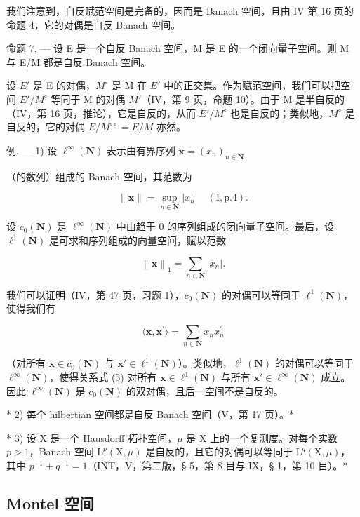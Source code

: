 我们注意到，自反赋范空间是完备的，因而是 Banach 空间，且由 IV 第 16 页的命题 4，它的对偶是自反 Banach 空间。

命题 7. --- 设 E 是一个自反 Banach 空间，M 是 E 的一个闭向量子空间。则 M 与 E/M 都是自反 Banach 空间。

设 \(E'\) 是 E 的对偶，\(M^{\circ}\) 是 M 在 \(E'\) 中的正交集。作为赋范空间，我们可以把空间 \(E'/M^{\circ}\) 等同于 M 的对偶 \(M'\)（IV，第 9 页，命题 10）。由于 M 是半自反的（IV，第 16 页，推论），它是自反的，从而 \(E'/M^{\circ}\) 也是自反的；类似地，\(M^{\circ}\) 是自反的，它的对偶 \(E/M^{\circ\circ} = E/M\) 亦然。

例. --- 1) 设 \(\ell^{\infty}(\mathbf{N})\) 表示由有界序列 \(\mathbf{x} = (x_n)_{n\in \mathbf{N}}\)

（的数列）组成的 Banach 空间，其范数为

\[
\| \mathbf {x} \| = \sup _ {n \in \mathbf {N}} | x _ {n} | \quad (\mathrm{I}, \text {p.} 4).\tag{3}
\]

设 \(c_{0}(\mathbf{N})\) 是 \(\ell^{\infty}(\mathbf{N})\) 中由趋于 0 的序列组成的闭向量子空间。最后，设 \(\ell^{1}(\mathbf{N})\) 是可求和序列组成的向量空间，赋以范数

\[
\left\| \mathbf {x} \right\| _ {1} = \sum_ {n \in \mathbf {N}} \left| x _ {n} \right|.\tag{4}
\]

我们可以证明（IV，第 47 页，习题 1），\(c_0(\mathbf{N})\) 的对偶可以等同于 \(\ell^1 (\mathbf{N})\)，使得我们有

\[
\langle \mathbf {x}, \mathbf {x} ^ {\prime} \rangle = \sum_ {n \in \mathbf {N}} x _ {n} x _ {n} ^ {\prime}\tag{5}
\]

（对所有 \(\mathbf{x} \in c_0(\mathbf{N})\) 与 \(\mathbf{x}' \in \ell^1(\mathbf{N})\)）。类似地，\(\ell^1(\mathbf{N})\) 的对偶可以等同于 \(\ell^\infty(\mathbf{N})\)，使得关系式 (5) 对所有 \(\mathbf{x} \in \ell^1(\mathbf{N})\) 与所有 \(\mathbf{x}' \in \ell^\infty(\mathbf{N})\) 成立。因此 \(\ell^\infty(\mathbf{N})\) 是 \(c_0(\mathbf{N})\) 的双对偶，且后一空间不是自反的。

* 2) 每个 hilbertian 空间都是自反 Banach 空间（V，第 17 页）。*

* 3) 设 X 是一个 Hausdorff 拓扑空间，\(\mu\) 是 X 上的一个复测度。对每个实数 \(p > 1\)，Banach 空间 \(\mathrm{L}^p (\mathrm{X},\mu)\) 是自反的，且它的对偶可以等同于 \(\mathrm{L}^q (\mathrm{X},\mu)\)，其中 \(p^{-1} + q^{-1} = 1\)（INT，V，第二版，§ 5，第 8 目与 IX，§ 1，第 10 目）。*

\subsection{Montel 空间}


